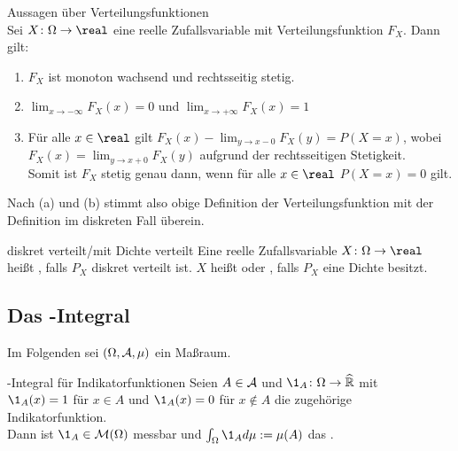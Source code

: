 \linie

\begin{Satz}{Aussagen über Verteilungsfunktionen}\\
    Sei $X\colon \Omega \rightarrow \real$ eine reelle Zufallsvariable mit Verteilungsfunktion
    $F_X$.
    Dann gilt:
    \begin{enumerate}
        \item
        $F_X$ ist monoton wachsend und rechtsseitig stetig.
        
        \item
        $\lim_{x \to -\infty} F_X(x) = 0$ und
        $\lim_{x \to +\infty} F_X(x) = 1$
        
        \item
        Für alle $x \in \real$ gilt $F_X(x) - \lim_{y \to x-0} F_X(y) = P(X = x)$,
        wobei $F_X(x) = \lim_{y \to x+0} F_X(y)$ aufgrund der rechtsseitigen Stetigkeit.\\
        Somit ist $F_X$ stetig genau dann, wenn für alle $x \in \real$ $P(X = x) = 0$ gilt.
    \end{enumerate}
\end{Satz}

\begin{Bem}
    Nach (a) und (b) stimmt also obige Definition der Verteilungsfunktion mit der
    Definition im diskreten Fall überein.
\end{Bem}

\begin{Def}{diskret verteilt/mit Dichte verteilt}
    Eine reelle Zufallsvariable $X\colon \Omega \rightarrow \real$ heißt
    , falls $P_X$ diskret verteilt ist.
    $X$ heißt  oder ,
    falls $P_X$ eine Dichte besitzt.
\end{Def}

\pagebreak

\subsection{%
    Das -Integral%
}

\begin{Bem}
    Im Folgenden sei $(\Omega, \mathcal{A}, \mu)$ ein Maßraum.
\end{Bem}

\begin{Def}{-Integral für Indikatorfunktionen}
    Seien $A \in \mathcal{A}$ und $\1_A\colon \Omega \rightarrow \extreal$ mit\\
    $\1_A(x) = 1$ für $x \in A$ und $\1_A(x) = 0$ für $x \notin A$
    die zugehörige Indikatorfunktion.\\
    Dann ist $\1_A \in \M(\Omega)$ messbar und
    $\int_\Omega \1_A d\mu := \mu(A)$ das .
\end{Def}

